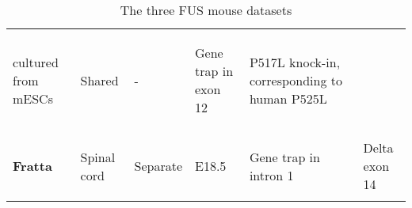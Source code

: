 \begin{longtable}[]{@{}llllll@{}}
\begin{minipage}[t]{0.14\columnwidth}
		{cultured from mESCs}\strut
	\end{minipage} & \begin{minipage}[t]{0.12\columnwidth}\raggedright\strut
		{Shared}\strut
	\end{minipage} & \begin{minipage}[t]{0.10\columnwidth}\raggedright\strut
		{-}\strut
	\end{minipage} & \begin{minipage}[t]{0.16\columnwidth}\raggedright\strut
		{Gene trap in exon 12}
		
		{ \footnotesize\citep{Hicks2000} }\strut
	\end{minipage} & \begin{minipage}[t]{0.16\columnwidth}\raggedright\strut
		{P517L knock-in,}
		{corresponding to human P525L}
		{\footnotesize\citep{Conte2012}}\strut
	\end{minipage}\tabularnewline \\
	\begin{minipage}[t]{0.16\columnwidth}\raggedright\strut
		{\textbf{Fratta}}\strut
	\end{minipage} & \begin{minipage}[t]{0.14\columnwidth}\raggedright\strut
		{Spinal cord}\strut
	\end{minipage} & \begin{minipage}[t]{0.12\columnwidth}\raggedright\strut
		{Separate}\strut
	\end{minipage} & \begin{minipage}[t]{0.10\columnwidth}\raggedright\strut
		{E18.5}\strut
	\end{minipage} & \begin{minipage}[t]{0.16\columnwidth}\raggedright\strut
		{Gene trap in intron 1}\strut
	\end{minipage} & \begin{minipage}[t]{0.16\columnwidth}\raggedright\strut
		{Delta exon 14 }
		{\footnotesize\citep{Devoy2017}}  \strut
	\end{minipage}\tabularnewline
	\bottomrule
	\caption{The three FUS mouse datasets}
	\label{tab:fus_datasets}
\end{longtable}


